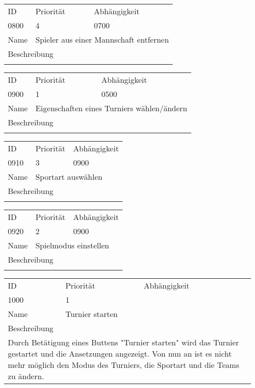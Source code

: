 	\begin{tabularx}{\textwidth}{|l|l|l|}
		ID & Priorität & Abhängigkeit \\
		0800 & 4 & 0700\\
		\hline
		Name & \multicolumn{2}{l}{Spieler aus einer Mannschaft entfernen} \\
		\multicolumn{3}{l}{Beschreibung}\\
		\multicolumn{3}{l}{}\\
		\hline		 
	\end{tabularx}
	
	\begin{tabularx}{\textwidth}{|l|l|l|}
		ID & Priorität & Abhängigkeit \\
		0900 & 1 & 0500\\
		\hline
		Name & \multicolumn{2}{l}{Eigenschaften eines Turniers wählen/ändern} \\
		\multicolumn{3}{l}{Beschreibung}\\
		\multicolumn{3}{l}{}\\
		\hline		 
	\end{tabularx}
	
	\begin{tabularx}{\textwidth}{|l|l|l|}
		ID & Priorität & Abhängigkeit \\
		0910 & 3 & 0900\\
		\hline
		Name & \multicolumn{2}{l}{Sportart auswählen} \\
		\multicolumn{3}{l}{Beschreibung}\\
		\multicolumn{3}{l}{}\\
		\hline		 
	\end{tabularx}
	
	\begin{tabularx}{\textwidth}{|l|l|l|}
		ID & Priorität & Abhängigkeit \\
		0920 & 2 & 0900\\
		\hline
		Name & \multicolumn{2}{l}{Spielmodus einstellen} \\
		\multicolumn{3}{l}{Beschreibung}\\
		\multicolumn{3}{l}{}\\
		\hline		 
	\end{tabularx}
	
	\begin{tabularx}{\textwidth}{|l|l|l|}
		ID & Priorität & Abhängigkeit \\
		1000 & 1 & \\
		\hline
		Name & \multicolumn{2}{l}{Turnier starten} \\
		\multicolumn{3}{l}{Beschreibung}\\
		\multicolumn{3}{l}{Durch Betätigung eines Buttens "Turnier starten" wird das Turnier gestartet und die Ansetzungen angezeigt. Von nun an ist es nicht mehr möglich den Modus des Turniers, die Sportart und die Teams zu ändern. }\\
		\hline		 
	\end{tabularx}
	
